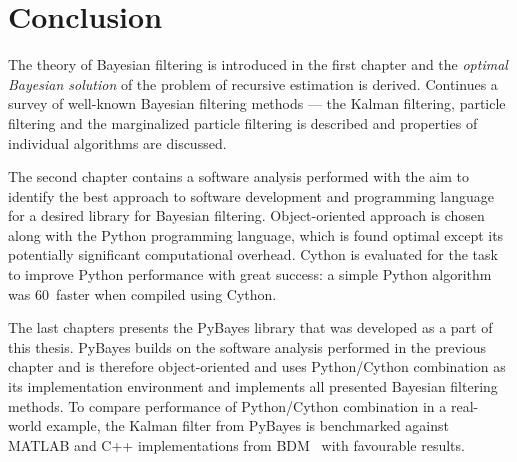\clearpage %
\chapter*{Conclusion}
\vspace{-3mm} %
The theory of Bayesian filtering is introduced in the first chapter and the \emph{optimal
Bayesian solution} of the problem of recursive estimation is derived. Continues a survey of
well-known Bayesian filtering methods --- the Kalman filtering, particle filtering and the
marginalized particle filtering is described and properties of individual algorithms are discussed.

The second chapter contains a software analysis performed with the aim to identify the best
approach to software development and programming language for a desired library for Bayesian
filtering. Object-oriented approach is chosen along with the Python programming language, which is
found optimal except its potentially significant computational overhead. Cython is evaluated for the
task to improve Python performance with great success: a simple Python algorithm was 60\x\ faster
when compiled using Cython.

The last chapters presents the PyBayes library that was developed as a part of this thesis. PyBayes
builds on the software analysis performed in the previous chapter and is therefore object-oriented
and uses Python/Cython combination as its implementation environment and implements all presented
Bayesian filtering methods. To compare performance of Python/Cython combination in a real-world
example, the Kalman filter from PyBayes is benchmarked against MATLAB and C++ implementations from
BDM~\cite{BDM} with favourable results.

